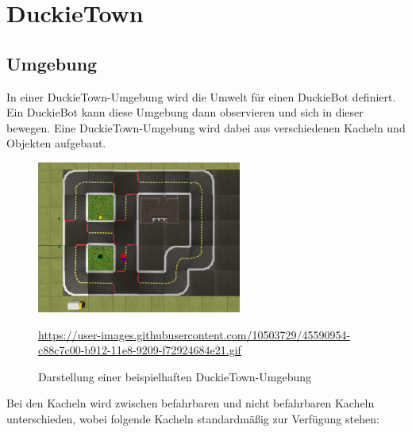 \chapter{DuckieTown}

\section{Umgebung}

In einer DuckieTown-Umgebung wird die Umwelt für einen DuckieBot definiert. Ein DuckieBot kann diese Umgebung dann observieren und sich in dieser bewegen. Eine DuckieTown-Umgebung wird dabei aus verschiedenen Kacheln und Objekten aufgebaut. 

\begin{figure}[H]
	\centering
	\includegraphics[width=0.6\textwidth]{kapitel2/images/duckietown-umgebung.png}
	\label{fig:duckietown-umgebung}
	\caption{Darstellung einer beispielhaften DuckieTown-Umgebung}
	\vspace{0.2cm}
	\quelle\url{https://user-images.githubusercontent.com/10503729/45590954-c88c7c00-b912-11e8-9209-f72924684e21.gif}
\end{figure}

Bei den Kacheln wird zwischen befahrbaren und nicht befahrbaren Kacheln unterschieden, wobei folgende Kacheln standardmäßig zur Verfügung stehen:


